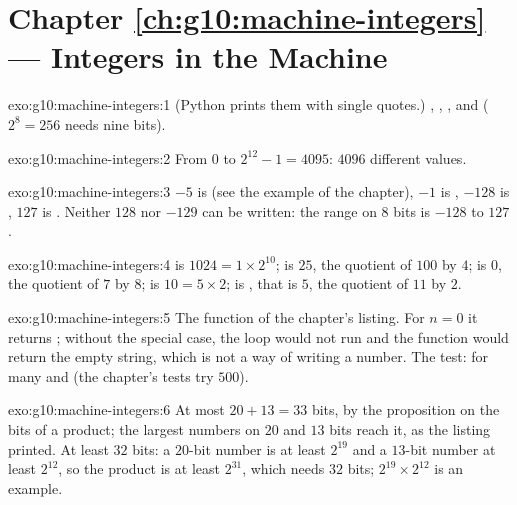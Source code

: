 \section*{Chapter \ref{ch:g10:machine-integers} --- Integers in the Machine}

\begin{solution}{exo:g10:machine-integers:1}
(Python prints them with single quotes.) , , ,  and  ($2^8 = 256$ needs nine bits).
\end{solution}

\begin{solution}{exo:g10:machine-integers:2}
From $0$ to $2^{12} - 1 = 4095$: $4096$ different values.
\end{solution}

\begin{solution}{exo:g10:machine-integers:3}
$-5$ is  (see the example of the chapter), $-1$ is , $-128$ is , $127$ is
. Neither $128$ nor $-129$ can be written: the range on $8$ bits is $-128$ to $127$.
\end{solution}

\begin{solution}{exo:g10:machine-integers:4}
 is $1024 = 1 \times 2^{10}$;  is $25$, the quotient of $100$ by $4$;  is $0$,
the quotient of $7$ by $8$;  is $10 = 5 \times 2$;  is , that is $5$, the
quotient of $11$ by $2$.
\end{solution}

\begin{solution}{exo:g10:machine-integers:5}
The function of the chapter's listing. For $n = 0$ it returns ; without the special case, the loop
 would not run and the function would return the empty string, which is not a way of writing a
number. The test:  for many  and  (the chapter's tests try $500$).
\end{solution}

\begin{solution}{exo:g10:machine-integers:6}
At most $20 + 13 = 33$ bits, by the proposition on the bits of a product; the largest numbers on $20$ and $13$ bits
reach it, as the listing printed. At least $32$ bits: a $20$-bit number is at least $2^{19}$ and a $13$-bit number at
least $2^{12}$, so the product is at least $2^{31}$, which needs $32$ bits; $2^{19} \times 2^{12}$ is an example.
\end{solution}

